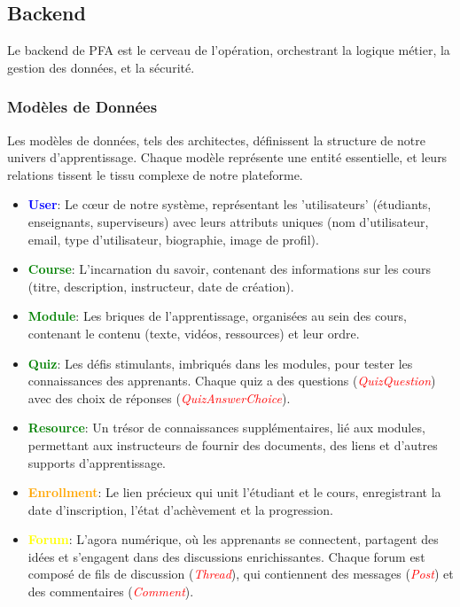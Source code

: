 \subsection{Backend}

Le backend de PFA est le cerveau de l'opération, orchestrant la logique métier, la gestion des données, et la sécurité.

\subsubsection{Modèles de Données}

Les modèles de données, tels des architectes, définissent la structure de notre univers d'apprentissage. Chaque modèle représente une entité essentielle, et leurs relations tissent le tissu complexe de notre plateforme.

\begin{itemize}
    \item \textbf{\textcolor{blue}{User}}: Le cœur de notre système, représentant les 'utilisateurs' (étudiants, enseignants, superviseurs) avec leurs attributs uniques (nom d'utilisateur, email, type d'utilisateur, biographie, image de profil).
    \item \textbf{\textcolor{green}{Course}}: L'incarnation du savoir, contenant des informations sur les cours (titre, description, instructeur, date de création).
    \item \textbf{\textcolor{green}{Module}}: Les briques de l'apprentissage, organisées au sein des cours, contenant le contenu (texte, vidéos, ressources) et leur ordre.
    \item \textbf{\textcolor{green}{Quiz}}: Les défis stimulants, imbriqués dans les modules, pour tester les connaissances des apprenants. Chaque quiz a des questions (\textit{\textcolor{red}{QuizQuestion}}) avec des choix de réponses (\textit{\textcolor{red}{QuizAnswerChoice}}).
    \item \textbf{\textcolor{green}{Resource}}: Un trésor de connaissances supplémentaires, lié aux modules, permettant aux instructeurs de fournir des documents, des liens et d'autres supports d'apprentissage.
    \item \textbf{\textcolor{orange}{Enrollment}}: Le lien précieux qui unit l'étudiant et le cours, enregistrant la date d'inscription, l'état d'achèvement et la progression.
    \item \textbf{\textcolor{yellow}{Forum}}: L'agora numérique, où les apprenants se connectent, partagent des idées et s'engagent dans des discussions enrichissantes. Chaque forum est composé de fils de discussion (\textit{\textcolor{red}{Thread}}), qui contiennent des messages (\textit{\textcolor{red}{Post}}) et des commentaires (\textit{\textcolor{red}{Comment}}).
\end{itemize}

